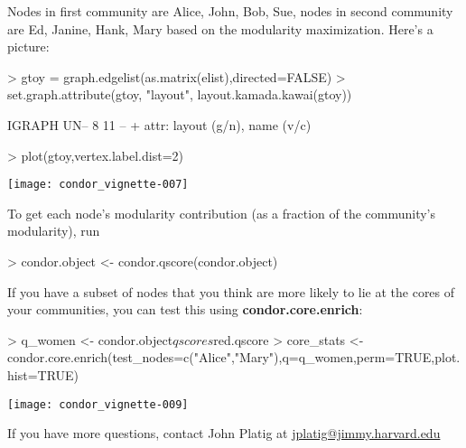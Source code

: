 \documentclass{article}
\begin{document}
Nodes in first community are {Alice, John, Bob, Sue}, nodes in second community are {Ed, Janine, Hank, Mary} based on the modularity maximization. Here's a picture:

\begin{Schunk}
\begin{Sinput}
> gtoy = graph.edgelist(as.matrix(elist),directed=FALSE)
> set.graph.attribute(gtoy, "layout", layout.kamada.kawai(gtoy))
\end{Sinput}
\begin{Soutput}
IGRAPH UN-- 8 11 -- 
+ attr: layout (g/n), name (v/c)
\end{Soutput}
\end{Schunk}

\begin{Schunk}
\begin{Sinput}
> plot(gtoy,vertex.label.dist=2)
\end{Sinput}
\end{Schunk}
\texttt{[image: condor\_vignette-007]}

To get each node's modularity contribution (as a fraction of the community's modularity), run
\begin{Schunk}
\begin{Sinput}
> condor.object <- condor.qscore(condor.object)   
\end{Sinput}
\end{Schunk}
If you have a subset of nodes that you think are more likely to lie at the cores of your communities, you can test this using \textbf{condor.core.enrich}:

\begin{Schunk}
\begin{Sinput}
> q_women <- condor.object$qscores$red.qscore
> core_stats <- condor.core.enrich(test_nodes=c("Alice","Mary"),q=q_women,perm=TRUE,plot.hist=TRUE)
\end{Sinput}
\end{Schunk}
\texttt{[image: condor\_vignette-009]}

If you have more questions, contact John Platig at \url{jplatig@jimmy.harvard.edu}
\end{document}
